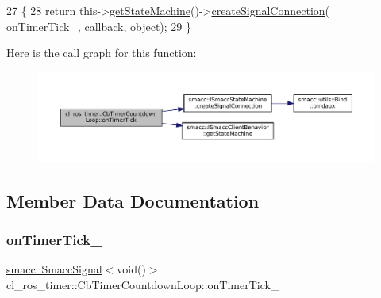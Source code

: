 \begin{DoxyCode}
27     \{
28         \textcolor{keywordflow}{return} this->\hyperlink{classsmacc_1_1ISmaccClientBehavior_a9d55a85bf0a920033805a3c050de2019}{getStateMachine}()->\hyperlink{classsmacc_1_1ISmaccStateMachine_adf0f42ade0c65cc471960fe2a7c42da2}{createSignalConnection}(
      \hyperlink{classcl__ros__timer_1_1CbTimerCountdownLoop_a9df6547f8ddf45107d8850d8a1a92cf4}{onTimerTick\_}, \hyperlink{sm__ridgeback__barrel__search__1_2servers_2opencv__perception__node_2opencv__perception__node_8cpp_a050e697bd654facce10ea3f6549669b3}{callback}, \textcolor{keywordtype}{object});
29     \}
\end{DoxyCode}
Here is the call graph for this function\+:
\nopagebreak
\begin{figure}[H]
\begin{center}
\leavevmode
\includegraphics[width=350pt]{classcl__ros__timer_1_1CbTimerCountdownLoop_ad251cc8444ca7070f64658bbb77e1275_cgraph}
\end{center}
\end{figure}


\subsection{Member Data Documentation}
\mbox{\label{classcl__ros__timer_1_1CbTimerCountdownLoop_a9df6547f8ddf45107d8850d8a1a92cf4}} 
\subsubsection{\texorpdfstring{on\+Timer\+Tick\+\_\+}{onTimerTick\_}}
{\footnotesize\ttfamily \hyperlink{classsmacc_1_1SmaccSignal}{smacc\+::\+Smacc\+Signal}$<$void()$>$ cl\+\_\+ros\+\_\+timer\+::\+Cb\+Timer\+Countdown\+Loop\+::on\+Timer\+Tick\+\_\+\hspace{0.3cm}{\ttfamily [private]}}



